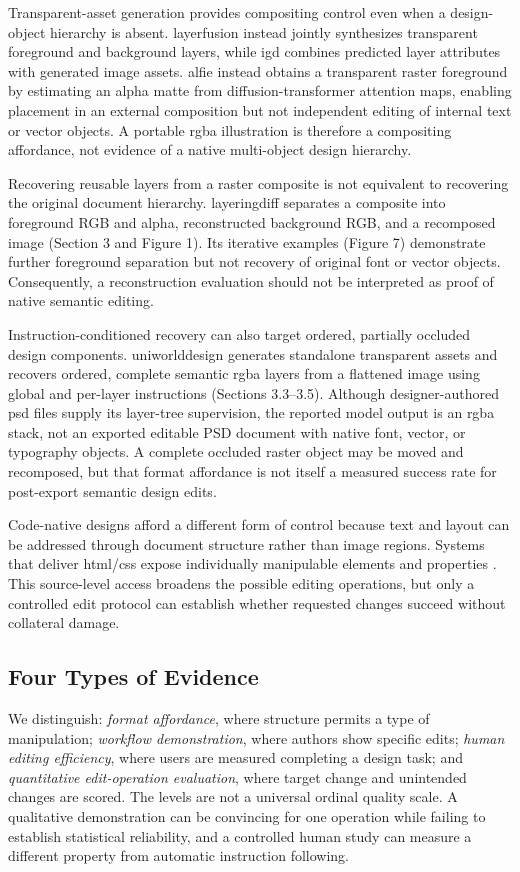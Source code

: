 Transparent-asset generation provides compositing control even when a design-object hierarchy is absent.
\ac{layerfusion} instead jointly synthesizes transparent foreground and background layers, while \ac{igd} combines predicted layer attributes with generated image assets.
\ac{alfie} instead obtains a transparent raster foreground by estimating an alpha matte from diffusion-transformer attention maps, enabling placement in an external composition but not independent editing of internal text or vector objects.
A portable \ac{rgba} illustration is therefore a compositing affordance, not evidence of a native multi-object design hierarchy.

Recovering reusable layers from a raster composite is not equivalent to recovering the original document hierarchy.
\ac{layeringdiff} separates a composite into foreground RGB and alpha, reconstructed background RGB, and a recomposed image (Section 3 and Figure 1).
Its iterative examples (Figure 7) demonstrate further foreground separation but not recovery of original font or vector objects.
Consequently, a reconstruction evaluation should not be interpreted as proof of native semantic editing.

Instruction-conditioned recovery can also target ordered, partially occluded design components.
\ac{uniworlddesign} generates standalone transparent assets and recovers ordered, complete semantic \ac{rgba} layers from a flattened image using global and per-layer instructions (Sections 3.3--3.5).
Although designer-authored \ac{psd} files supply its layer-tree supervision, the reported model output is an \ac{rgba} stack, not an exported editable PSD document with native font, vector, or typography objects.
A complete occluded raster object may be moved and recomposed, but that format affordance is not itself a measured success rate for post-export semantic design edits.

Code-native designs afford a different form of control because text and layout can be addressed through document structure rather than image regions.
Systems that deliver \ac{html}/\ac{css} expose individually manipulable elements and properties \citep{designascode2026,editablevisual2026}.
This source-level access broadens the possible editing operations, but only a controlled edit protocol can establish whether requested changes succeed without collateral damage.

\subsection{Four Types of Evidence}
We distinguish: \emph{format affordance}, where structure permits a type of manipulation; \emph{workflow demonstration}, where authors show specific edits; \emph{human editing efficiency}, where users are measured completing a design task; and \emph{quantitative edit-operation evaluation}, where target change and unintended changes are scored.
The levels are not a universal ordinal quality scale.
A qualitative demonstration can be convincing for one operation while failing to establish statistical reliability, and a controlled human study can measure a different property from automatic instruction following.
